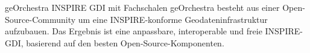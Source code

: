 %
{geOrchestra}%
{INSPIRE GDI mit Fachschalen}%
{
geOrchestra besteht aus einer Open-Source-Community um eine INSPIRE-konforme Geodateninfrastruktur
aufzubauen. Das Ergebnis ist eine anpassbare, interoperable und freie INSPIRE-GDI, basierend auf den
besten Open-Source-Komponenten.%
}

\label{bof-mittwoch}

\label{social-event}
\RaggedRight
{}
\justifying
